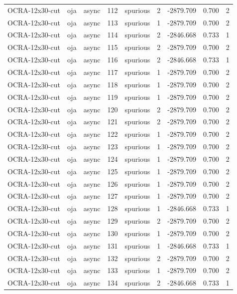 \begin{tabular}{lllrlrrrr}
OCRA-12x30-cut & oja & async & 112 & spurious & 2 & -2879.709 & 0.700 & 2 \\
OCRA-12x30-cut & oja & async & 113 & spurious & 1 & -2879.709 & 0.700 & 2 \\
OCRA-12x30-cut & oja & async & 114 & spurious & 2 & -2846.668 & 0.733 & 1 \\
OCRA-12x30-cut & oja & async & 115 & spurious & 2 & -2879.709 & 0.700 & 2 \\
OCRA-12x30-cut & oja & async & 116 & spurious & 2 & -2846.668 & 0.733 & 1 \\
OCRA-12x30-cut & oja & async & 117 & spurious & 1 & -2879.709 & 0.700 & 2 \\
OCRA-12x30-cut & oja & async & 118 & spurious & 1 & -2879.709 & 0.700 & 2 \\
OCRA-12x30-cut & oja & async & 119 & spurious & 1 & -2879.709 & 0.700 & 2 \\
OCRA-12x30-cut & oja & async & 120 & spurious & 2 & -2879.709 & 0.700 & 2 \\
OCRA-12x30-cut & oja & async & 121 & spurious & 2 & -2879.709 & 0.700 & 2 \\
OCRA-12x30-cut & oja & async & 122 & spurious & 1 & -2879.709 & 0.700 & 2 \\
OCRA-12x30-cut & oja & async & 123 & spurious & 1 & -2879.709 & 0.700 & 2 \\
OCRA-12x30-cut & oja & async & 124 & spurious & 1 & -2879.709 & 0.700 & 2 \\
OCRA-12x30-cut & oja & async & 125 & spurious & 1 & -2879.709 & 0.700 & 2 \\
OCRA-12x30-cut & oja & async & 126 & spurious & 1 & -2879.709 & 0.700 & 2 \\
OCRA-12x30-cut & oja & async & 127 & spurious & 1 & -2879.709 & 0.700 & 2 \\
OCRA-12x30-cut & oja & async & 128 & spurious & 1 & -2846.668 & 0.733 & 1 \\
OCRA-12x30-cut & oja & async & 129 & spurious & 2 & -2879.709 & 0.700 & 2 \\
OCRA-12x30-cut & oja & async & 130 & spurious & 1 & -2879.709 & 0.700 & 2 \\
OCRA-12x30-cut & oja & async & 131 & spurious & 1 & -2846.668 & 0.733 & 1 \\
OCRA-12x30-cut & oja & async & 132 & spurious & 2 & -2879.709 & 0.700 & 2 \\
OCRA-12x30-cut & oja & async & 133 & spurious & 1 & -2879.709 & 0.700 & 2 \\
OCRA-12x30-cut & oja & async & 134 & spurious & 2 & -2846.668 & 0.733 & 1 \\

\end{tabular}

